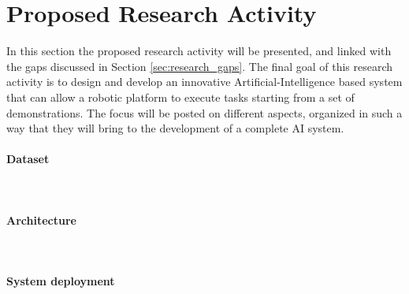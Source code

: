 \section{Proposed Research Activity}
\label{sec:research_activity}
In this section the proposed research activity will be presented, and linked with the gaps discussed in Section \ref{sec:research_gaps}. 
\newline The final goal of this research activity is to design and develop an innovative Artificial-Intelligence based system that can allow a robotic platform to execute tasks starting from a set of demonstrations. The focus will be posted on different aspects, organized in such a way that they will bring to the development of a complete AI system. 
\paragraph{Dataset} \mbox{} \\
\paragraph{Architecture} \mbox{} \\
\paragraph{System deployment} \mbox{} \\
